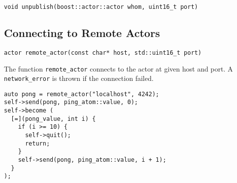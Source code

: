 \begin{lstlisting}
void unpublish(boost::actor::actor whom, uint16_t port)
\end{lstlisting}

\clearpage
\subsection{Connecting to Remote Actors}

\begin{lstlisting}
actor remote_actor(const char* host, std::uint16_t port)
\end{lstlisting}

The function \lstinline^remote_actor^ connects to the actor at given host and port.
A \lstinline^network_error^ is thrown if the connection failed.

\begin{lstlisting}
auto pong = remote_actor("localhost", 4242);
self->send(pong, ping_atom::value, 0);
self->become (
  [=](pong_value, int i) {
    if (i >= 10) {
      self->quit();
      return;
    }
    self->send(pong, ping_atom::value, i + 1);
  }
);
\end{lstlisting}
